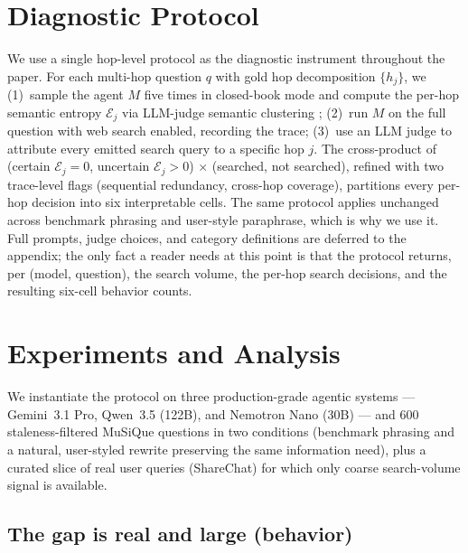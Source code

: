 \documentclass[10pt,letterpaper]{article}
\begin{document}
\section{Diagnostic Protocol}\label{sec:protocol}

We use a single hop-level protocol as the diagnostic instrument throughout the paper.
For each multi-hop question $q$ with gold hop decomposition $\{h_j\}$, we (1)~sample
the agent $M$ five times in closed-book mode and compute the per-hop semantic
entropy $\mathcal{E}_j$ via LLM-judge semantic clustering \citep{farquhar2024};
(2)~run $M$ on the full question with web search enabled, recording the trace;
(3)~use an LLM judge to attribute every emitted search query to a specific hop
$j$. The cross-product of (certain $\mathcal{E}_j{=}0$, uncertain $\mathcal{E}_j{>}0$)
${\times}$ (searched, not searched), refined with two trace-level flags
(sequential redundancy, cross-hop coverage), partitions every per-hop decision into
six interpretable cells. The same protocol applies unchanged across benchmark
phrasing and user-style paraphrase, which is why we use it. Full prompts, judge
choices, and category definitions are deferred to the appendix; the only fact a
reader needs at this point is that the protocol returns, per (model, question), the
search volume, the per-hop search decisions, and the resulting six-cell behavior
counts.

\section{Experiments and Analysis}\label{sec:experiments}

We instantiate the protocol on three production-grade agentic systems --- Gemini~3.1
Pro, Qwen~3.5 (122B), and Nemotron Nano (30B) --- and 600 staleness-filtered MuSiQue
\citep{musique} questions in two conditions (benchmark phrasing and a natural,
user-styled rewrite preserving the same information need), plus a curated slice of
real user queries (ShareChat) for which only coarse search-volume signal is
available.

\subsection{The gap is real and large (behavior)}\label{sec:gap_behavior}
\end{document}
